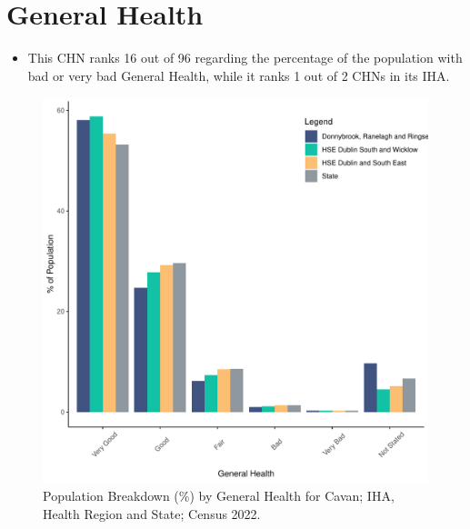 \documentclass{article}
\begin{document}
\pagebreak

\section{General Health}\label{sect:GenHealth}
\begin{itemize}
\item  This CHN ranks  16 out of 96 regarding the percentage of the population with bad or very bad General Health, while it ranks   1 out of 2 CHNs in its IHA.
\end{itemize}
\begin{figure}[h]
	\centering
	\includegraphics[width = 150mm]{../figures/GenED.pdf}
	\caption{Population Breakdown (\%) by General Health for Cavan; IHA, Health Region and State;  Census 2022.}
	\label{fig:2ae19629-1a6a-13a3-e055-000000000001}
	\end{figure}
\end{document}
